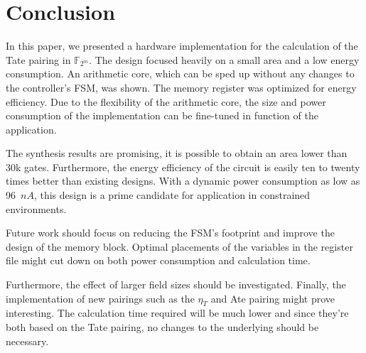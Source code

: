 \section{Conclusion\label{section-conclusion}}

In this paper, we presented a hardware implementation for the calculation of the Tate pairing in $\mathbb{F}_{2^m}$. The design focused heavily on a small area and a low energy consumption. An arithmetic core, which can be sped up without any changes to the controller's FSM, was shown. The memory register was optimized for energy efficiency. Due to the flexibility of the arithmetic core, the size and power consumption of the implementation can be fine-tuned in function of the application.

The synthesis results are promising, it is possible to obtain an area lower than 30k gates. Furthermore, the energy efficiency of the circuit is easily ten to twenty times better than existing designs. With a dynamic power consumption as low as 96~$nA$, this design is a prime candidate for application in constrained environments.

Future work should focus on reducing the FSM's footprint and improve the design of the memory block. Optimal placements of the variables in the register file might cut down on both power consumption and calculation time.

Furthermore, the effect of larger field sizes should be investigated. Finally, the implementation of new pairings such as the $\eta_T$ and Ate pairing might prove interesting. The calculation time required will be much lower and since they're both based on the Tate pairing, no changes to the underlying should be necessary.
